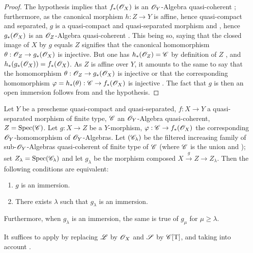 \begin{proof}
The hypothesis implies that $f_*(\mathscr{O}_X)$ is an $\mathscr{O}_Y$-Algebra quasi-coherent ; furthermore, as the canonical morphism $h:Z\to Y$ is affine, hence quasi-compact and separated, $g$ is a quasi-compact and quasi-separated morphism  and , hence $g_*(\mathscr{O}_X)$ is an $\mathscr{O}_Z$-Algebra quasi-coherent .
This being so, saying that the closed image of $X$ by $g$ equals $Z$ signifies  that the canonical homomorphism $\theta:\mathscr{O}_Z\to g_*(\mathscr{O}_X)$ is injective.
But one has $h_*(\mathscr{O}_Z)=\mathscr{C}$ by definition of $Z$ , and $h_*(g_*(\mathscr{O}_X))=f_*(\mathscr{O}_X)$.
As $Z$ is affine over $Y$, it amounts to the same to say that the homomorphism $\theta:\mathscr{O}_Z\to g_*(\mathscr{O}_X)$ is injective or that the corresponding homomorphism $\varphi=h_*(\theta):\mathscr{C}\to f_*(\mathscr{O}_X)$ is injective .
The fact that $g$ is then an open immersion follows from  and the hypothesis.
\end{proof}

\begin{lemma}[8.12.2]
\label{IV.8.12.2}
Let $Y$ be a prescheme quasi-compact and quasi-separated, $f:X\to Y$ a quasi-separated morphism of finite type, $\mathscr{C}$ an $\mathscr{O}_Y$-Algebra quasi-coherent, $Z=\operatorname{Spec}(\mathscr{C})$.
Let $g:X\to Z$ be a $Y$-morphism, $\varphi:\mathscr{C}\to f_*(\mathscr{O}_X)$ the corresponding $\mathscr{O}_Y$-homomorphism of $\mathscr{O}_Y$-Algebras.
Let $(\mathscr{C}_\lambda)$ be the filtered increasing family of sub-$\mathscr{O}_Y$-Algebras quasi-coherent of finite type of $\mathscr{C}$ (where $\mathscr{C}$ is the union  and ); set $Z_\lambda=\operatorname{Spec}(\mathscr{C}_\lambda)$ and let $g_\lambda$ be the morphism composed $X\xrightarrow{g}Z\to Z_\lambda$.
Then the following conditions are equivalent:
\begin{enumerate}[label=\emph{\alph*)}]
  \item $g$ is an immersion.
  \item There exists $\lambda$ such that $g_\lambda$ is an immersion.
\end{enumerate}
Furthermore, when $g_\lambda$ is an immersion, the same is true of $g_\mu$ for $\mu\geqslant\lambda$.

It suffices to apply  by replacing $\mathscr{L}$ by $\mathscr{O}_X$ and $\mathscr{S}$ by $\mathscr{C}[\mathrm{T}]$, and taking into account .
\end{lemma}

